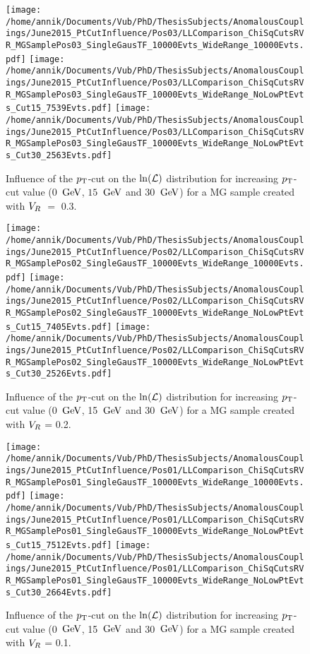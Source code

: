 \begin{figure}[h!t]
 \centering
 \texttt{[image: /home/annik/Documents/Vub/PhD/ThesisSubjects/AnomalousCouplings/June2015\_PtCutInfluence/Pos03/LLComparison\_ChiSqCutsRVR\_MGSamplePos03\_SingleGausTF\_10000Evts\_WideRange\_10000Evts.pdf]}
 \texttt{[image: /home/annik/Documents/Vub/PhD/ThesisSubjects/AnomalousCouplings/June2015\_PtCutInfluence/Pos03/LLComparison\_ChiSqCutsRVR\_MGSamplePos03\_SingleGausTF\_10000Evts\_WideRange\_NoLowPtEvts\_Cut15\_7539Evts.pdf]}
 \texttt{[image: /home/annik/Documents/Vub/PhD/ThesisSubjects/AnomalousCouplings/June2015\_PtCutInfluence/Pos03/LLComparison\_ChiSqCutsRVR\_MGSamplePos03\_SingleGausTF\_10000Evts\_WideRange\_NoLowPtEvts\_Cut30\_2563Evts.pdf]}
 \caption{Influence of the $p_{\textrm T}$-cut on the $\ln(\mathcal{L})$ distribution for increasing $p_{\textrm T}$-cut value ($0$ $\, \mathrm{GeV}$, $15$ $\, \mathrm{GeV}$ and $30$ $\, \mathrm{GeV}$) for a MG sample created with $V_{R}$ $=$ $0.3$.}
 \label{fig::PtCutInflPos03}
\end{figure}

\begin{figure}[h!t]
 \centering
 \texttt{[image: /home/annik/Documents/Vub/PhD/ThesisSubjects/AnomalousCouplings/June2015\_PtCutInfluence/Pos02/LLComparison\_ChiSqCutsRVR\_MGSamplePos02\_SingleGausTF\_10000Evts\_WideRange\_10000Evts.pdf]}
 \texttt{[image: /home/annik/Documents/Vub/PhD/ThesisSubjects/AnomalousCouplings/June2015\_PtCutInfluence/Pos02/LLComparison\_ChiSqCutsRVR\_MGSamplePos02\_SingleGausTF\_10000Evts\_WideRange\_NoLowPtEvts\_Cut15\_7405Evts.pdf]}
 \texttt{[image: /home/annik/Documents/Vub/PhD/ThesisSubjects/AnomalousCouplings/June2015\_PtCutInfluence/Pos02/LLComparison\_ChiSqCutsRVR\_MGSamplePos02\_SingleGausTF\_10000Evts\_WideRange\_NoLowPtEvts\_Cut30\_2526Evts.pdf]}
 \caption{Influence of the $p_{\textrm T}$-cut on the $\ln(\mathcal{L})$ distribution for increasing $p_{\textrm T}$-cut value (0 $\, \mathrm{GeV}$, 15 $\, \mathrm{GeV}$ and 30 $\, \mathrm{GeV}$) for a MG sample created with $V_{R}$ = 0.2.}
 \label{fig::PtCutInflPos02}
\end{figure}

\begin{figure}[h!t]
 \centering
 \texttt{[image: /home/annik/Documents/Vub/PhD/ThesisSubjects/AnomalousCouplings/June2015\_PtCutInfluence/Pos01/LLComparison\_ChiSqCutsRVR\_MGSamplePos01\_SingleGausTF\_10000Evts\_WideRange\_10000Evts.pdf]}
 \texttt{[image: /home/annik/Documents/Vub/PhD/ThesisSubjects/AnomalousCouplings/June2015\_PtCutInfluence/Pos01/LLComparison\_ChiSqCutsRVR\_MGSamplePos01\_SingleGausTF\_10000Evts\_WideRange\_NoLowPtEvts\_Cut15\_7512Evts.pdf]}
 \texttt{[image: /home/annik/Documents/Vub/PhD/ThesisSubjects/AnomalousCouplings/June2015\_PtCutInfluence/Pos01/LLComparison\_ChiSqCutsRVR\_MGSamplePos01\_SingleGausTF\_10000Evts\_WideRange\_NoLowPtEvts\_Cut30\_2664Evts.pdf]}
 \caption{Influence of the $p_{\textrm T}$-cut on the $\ln(\mathcal{L})$ distribution for increasing $p_{\textrm T}$-cut value (0 $\, \mathrm{GeV}$, 15 $\, \mathrm{GeV}$ and 30 $\, \mathrm{GeV}$) for a MG sample created with $V_{R}$ = 0.1.}
 \label{fig::PtCutInflPos01}
\end{figure}

